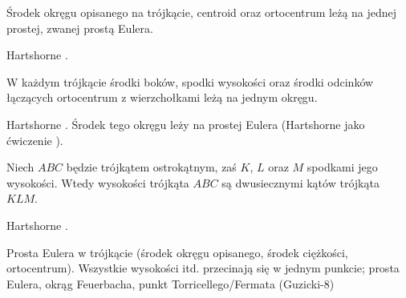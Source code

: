%

\begin{proposition}
	\label{prosta_eulera}
	Środek okręgu opisanego na trójkącie, centroid oraz ortocentrum leżą na jednej prostej, zwanej prostą Eulera.
\end{proposition}

Hartshorne \cite[s. 54, 55]{hartshorne2000}.

\begin{proposition}
	\label{okrag_dziewieciu_punktow}
	W każdym trójkącie środki boków, spodki wysokości oraz środki odcinków łączących ortocentrum z wierzchołkami leżą na jednym okręgu.
\end{proposition}

Hartshorne \cite[s. 57]{hartshorne2000}.
Środek tego okręgu leży na prostej Eulera (Hartshorne jako ćwiczenie \cite[s. 60]{hartshorne2000}).

\begin{proposition}
	\label{orthic_triangle}
	Niech $ABC$ będzie trójkątem ostrokątnym, zaś $K$, $L$ oraz $M$ spodkami jego wysokości.
	Wtedy wysokości trójkąta $ABC$ są dwusiecznymi kątów trójkąta $KLM$.
\end{proposition}

Hartshorne \cite[s. 58]{hartshorne2000}.


Prosta Eulera w trójkącie (środek okręgu opisanego, środek ciężkości, ortocentrum).
Wszystkie wysokości itd. przecinają się w jednym punkcie; prosta Eulera, okrąg Feuerbacha, punkt Torricellego/Fermata (Guzicki-8)

